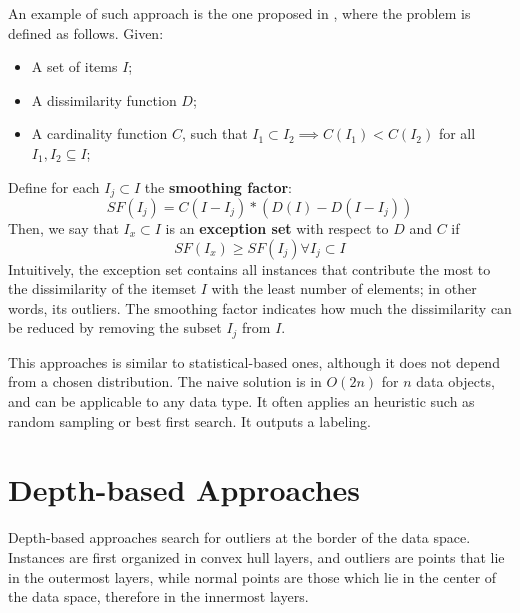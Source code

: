 An example of such approach is the one proposed in \cite{arning1996linear}, where the problem is defined as follows. Given:
\begin{itemize}
    \item A set of items $I$;
    \item A dissimilarity function $D$;
    \item A cardinality function $C$, such that $I_1 \subset I_2 \implies C(I_1) < C(I_2)$ for all $I_1, I_2 \subseteq I$;
\end{itemize}
Define for each $I_j \subset I$ the \textbf{smoothing factor}:
\begin{equation*}
    SF(I_j) = C(I-I_j) * (D(I) - D(I-I_j))
\end{equation*}
Then, we say that $I_x \subset I$ is an \textbf{exception set} with respect to $D$ and $C$ if
\begin{equation*}
    SF(I_x) \geq SF(I_j) \forall I_j \subset I
\end{equation*}
Intuitively, the exception set contains all instances that contribute the most to the dissimilarity of the itemset $I$ with the least number of elements; in other words, its outliers. The smoothing factor indicates how much the dissimilarity can be reduced by removing the subset $I_j$ from $I$. 

This approaches is similar to statistical-based ones, although it does not depend from a chosen distribution. The naive solution is in $O(2n)$ for $n$ data objects, and can be applicable to any data type. It often applies an heuristic such as random sampling or best first search. It outputs a labeling.

\section{Depth-based Approaches}

Depth-based approaches search for outliers at the border of the data space. Instances are first organized in convex hull layers, and outliers are points that lie in the outermost layers, while normal points are those which lie in the center of the data space, therefore in the innermost layers.

